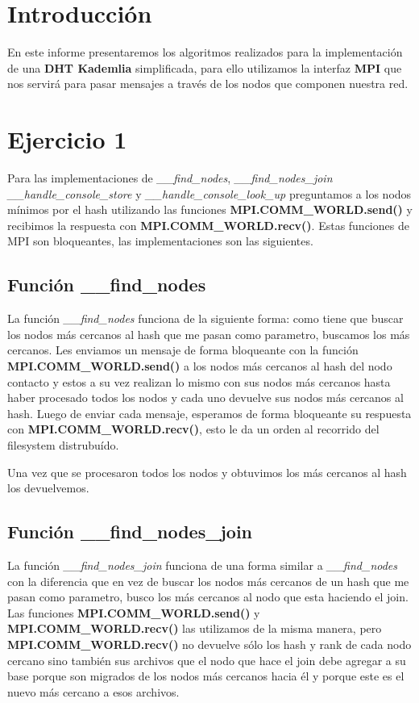 \section{Introducción}
En este informe presentaremos los algoritmos realizados para la implementación de una \textbf{DHT Kademlia} simplificada, para ello utilizamos la interfaz \textbf{MPI} que nos servirá para pasar mensajes a través de los nodos que componen nuestra red.

\section{Ejercicio 1}
Para las implementaciones de \emph{\_\_find\_nodes}, \emph{\_\_find\_nodes\_join} \emph{\_\_handle\_console\_store} y \emph{\_\_handle\_console\_look\_up} preguntamos a los nodos mínimos por el hash utilizando las funciones \textbf{MPI.COMM\_WORLD.send()} y recibimos la respuesta con \textbf{MPI.COMM\_WORLD.recv()}. Estas funciones de MPI son bloqueantes, las implementaciones son las siguientes.

\subsection{Función \_\_find\_nodes}
La función \emph{\_\_find\_nodes} funciona de la siguiente forma: como tiene que buscar los nodos más cercanos al hash que me pasan como parametro, buscamos los más cercanos. Les enviamos un mensaje de forma bloqueante con la función \textbf{MPI.COMM\_WORLD.send()} a los nodos más cercanos al hash del nodo contacto y estos a su vez realizan lo mismo con sus nodos más cercanos hasta haber procesado todos los nodos y cada uno devuelve sus nodos más cercanos al hash. Luego de enviar cada mensaje, esperamos de forma bloqueante su respuesta con \textbf{MPI.COMM\_WORLD.recv()}, esto le da un orden al recorrido del filesystem distrubuído.

Una vez que se procesaron todos los nodos y obtuvimos los más cercanos al hash los devuelvemos.


\subsection{Función \_\_find\_nodes\_join}
La función \emph{\_\_find\_nodes\_join} funciona de una forma similar a \emph{\_\_find\_nodes} con la diferencia que en vez de buscar los nodos más cercanos de un hash que me pasan como parametro, busco los más cercanos al nodo que esta haciendo el join. Las funciones \textbf{MPI.COMM\_WORLD.send()} y \textbf{MPI.COMM\_WORLD.recv()} las utilizamos de la misma manera, pero \textbf{MPI.COMM\_WORLD.recv()} no devuelve sólo los hash y rank de cada nodo cercano sino también sus archivos que el nodo que hace el join debe agregar a su base porque son migrados de los nodos más cercanos hacia él y porque este es el nuevo más cercano a esos archivos.

